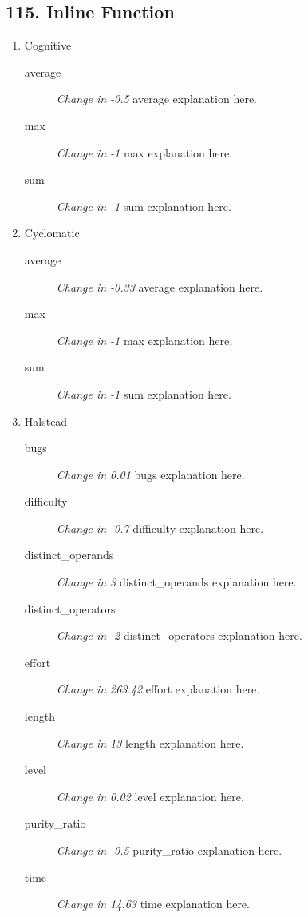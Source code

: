 \subsection{ 115.  Inline Function }

\begin{enumerate}
      \item Cognitive
            \begin{description}
                  \item [average] \textit{Change in -0.5} average explanation here.
                  \item [max] \textit{Change in -1} max explanation here.
                  \item [sum] \textit{Change in -1} sum explanation here.
            \end{description}
      \item Cyclomatic
            \begin{description}
                  \item [average] \textit{Change in -0.33} average explanation here.
                  \item [max] \textit{Change in -1} max explanation here.
                  \item [sum] \textit{Change in -1} sum explanation here.
            \end{description}
      \item Halstead
            \begin{description}
                  \item [bugs] \textit{Change in 0.01} bugs explanation here.
                  \item [difficulty] \textit{Change in -0.7} difficulty explanation here.
                  \item [distinct\_operands] \textit{Change in 3} distinct\_operands explanation here.
                  \item [distinct\_operators] \textit{Change in -2} distinct\_operators explanation here.
                  \item [effort] \textit{Change in 263.42} effort explanation here.
                  \item [length] \textit{Change in 13} length explanation here.
                  \item [level] \textit{Change in 0.02} level explanation here.
                  \item [purity\_ratio] \textit{Change in -0.5} purity\_ratio explanation here.
                  \item [time] \textit{Change in 14.63} time explanation here.

\end{description}
\end{enumerate}

